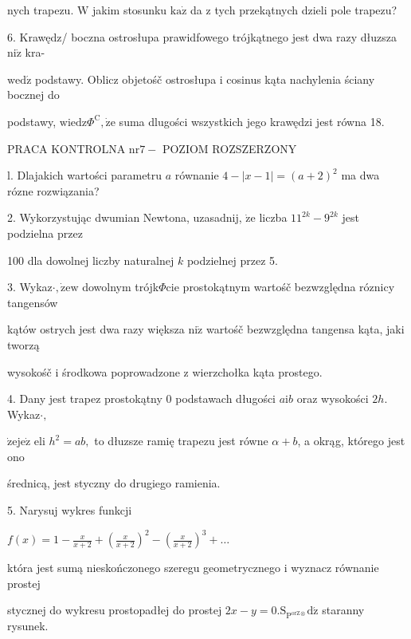 \documentclass[a4paper,12pt]{article}
\begin{document}
nych trapezu. $\mathrm{W}$ jakim stosunku $\mathrm{k}\mathrm{a}\dot{\mathrm{z}}$ da $\mathrm{z}$ tych przekątnych dzieli pole trapezu?

6. Krawędz/ boczna ostrosłupa prawidfowego trójkątnego jest dwa razy dłuzsza $\mathrm{n}\mathrm{i}\dot{\mathrm{z}}$ kra-

$\mathrm{w}\mathrm{e}\mathrm{d}\acute{\mathrm{z}}$ podstawy. Oblicz objetośč ostrosłupa $\mathrm{i}$ cosinus kąta nachylenia ściany bocznej do

podstawy, $\mathrm{w}\mathrm{i}\mathrm{e}\mathrm{d}\mathrm{z}\Phi^{\mathrm{C}}, \dot{\mathrm{z}}\mathrm{e}$ suma dlugości wszystkich jego krawędzi jest równa 18.




PRACA KONTROLNA $\mathrm{n}\mathrm{r} 7-$ POZIOM ROZSZERZONY

l. Dlajakich wartości parametru $a$ równanie $4-|x-1|=(a+2)^{2}$ ma dwa rózne rozwiązania?

2. Wykorzystując dwumian Newtona, uzasadnij, $\dot{\mathrm{z}}\mathrm{e}$ liczba $11^{2k}-9^{2k}$ jest podzielna przez

100 dla dowolnej liczby naturalnej $k$ podzielnej przez 5.

3. Wykaz$\cdot, \dot{\mathrm{z}}\mathrm{e}\mathrm{w}$ dowolnym trójk$\Phi$cie prostokątnym wartośč bezwzględna róznicy tangensów

kątów ostrych jest dwa razy większa $\mathrm{n}\mathrm{i}\dot{\mathrm{z}}$ wartośč bezwzględna tangensa kąta, jaki tworzą

wysokośč $\mathrm{i}$ środkowa poprowadzone $\mathrm{z}$ wierzchołka kąta prostego.

4. Dany jest trapez prostokątny $0$ podstawach długości $a\mathrm{i}b$ oraz wysokości $2h$. Wykaz$\cdot,$

$\dot{\mathrm{z}}\mathrm{e}\mathrm{j}\mathrm{e}\dot{\mathrm{z}}$ eli $h^{2}=ab,$ to dłuzsze ramię trapezu jest równe $\alpha+b$, a okrąg, którego jest ono

średnicą, jest styczny do drugiego ramienia.

5. Narysuj wykres funkcji

$ f(x)=1-\displaystyle \frac{x}{x+2}+(\frac{x}{x+2})^{2}-(\frac{x}{x+2})^{3}+\ldots$

która jest sumą nieskończonego szeregu geometrycznego $\mathrm{i}$ wyznacz równanie prostej

stycznej do wykresu prostopadłej do prostej $2x-y=0. \mathrm{S}_{\mathrm{P}^{\mathrm{o}\mathrm{r}\mathrm{Z}\otimes}}\mathrm{d}\acute{\mathrm{z}}$ staranny rysunek.
\end{document}
